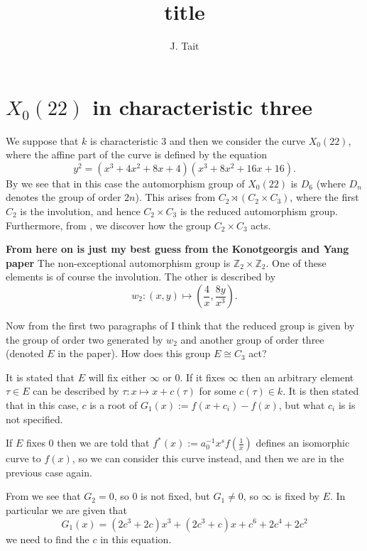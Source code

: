 \documentclass[draft, 11pt]{article} %
\title{title}
\author{J. Tait}
\theoremstyle{plain}
\theoremstyle{remark}
\newcommand{\ZZ}{{\mathbb Z}}
\begin{document}
\maketitle

\section{$X_0(22)$ in characteristic three}
We suppose that $k$ is characteristic 3 and then we consider the curve $X_0(22)$, where the affine part of the curve is defined by the equation
\begin{equation}\label{x22}
y^2 = (x^3+ 4x^2 + 8x + 4)( x^3 + 8x^2 + 16x + 16).
\end{equation}
By \cite{automorphismshyperellipticmodular} we see that in this case the automorphism group of $X_0(22)$ is $D_6$ (where $D_n$ denotes the group of order $2n$).
This arises from $C_2 \rtimes (C_2 \times C_3)$, where the first $C_2$ is the involution, and hence $C_2 \times C_3$ is the reduced automorphism group.
Furthermore, from \cite{automorphismgrouphyperelliptic}, we discover how the group $C_2 \times C_3$ acts.

{\bf From here on is just my best guess from the Konotgeorgis and Yang paper}
The non-exceptional automorphism group is $\ZZ_2 \times \ZZ_2$.
One of these elements is of course the involution.
The other is described by 
\[
w_2:(x,y) \mapsto \left( \frac{4}{x}, \frac{8y}{x^3} \right).
\]

Now from the first two paragraphs of \cite[\S 3.3]{automorphismshyperellipticmodular} I think that the reduced group is given by the group of order two generated by $w_2$ and another group of order three (denoted $E$ in the paper).
How does this group $E \cong C_3$ act?

It is stated that $E$ will fix either $\infty$ or 0.
If it fixes $\infty$ then an arbitrary element $\tau \in E$ can be described by $\tau \colon x \mapsto  x+ c( \tau)$ for some $c (\tau) \in k$.
It is then stated that in this case, $c$ is a root of $G_1(x):= f(x + c_i) - f(x)$, but what $c_i$ is is not specified.

If $E$ fixes 0 then we are told that $f^*(x) := a_0^{-1}x^s f\left( \frac{1}{x} \right)$ defines an isomorphic curve to $f(x)$, so we can consider this curve instead, and then we are in the previous case again.

From \cite[Table 7]{automorphismshyperellipticmodular} we see that $G_2 = 0$, so $0$ is not fixed, but $G_1 \neq 0$, so $\infty$ is fixed by $E$.
In particular we are given that
\begin{equation*}
G_1(x) = (2c^3+2c)x^3 + (2c^3 + c) x + c^6 + 2c^4 + 2c^2
\end{equation*}
we need to find the $c$ in this equation.
\end{document}
